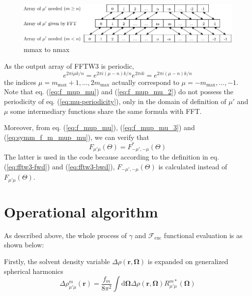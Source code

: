 \begin{figure}[h]
\centering{}%
\begin{minipage}[t]{1\textwidth}%
\begin{center}
\includegraphics[width=1\textwidth]{_figure/mmax_to_nmax}
\par\end{center}

\caption[mmax to nmax]{mmax to nmax\label{fig:FFTW3-2D-mmax_to_nmax}}
%
\end{minipage}
\end{figure}


As the output array of FFTW3 is periodic,
\begin{equation}
e^{2\pi i\mu k/n}=e^{2\pi i(\mu-n)k/n}e^{2\pi ik}=e^{2\pi i(\mu-n)k/n}\label{eq:mu-periodicity}
\end{equation}
the indices $\mu=m_{\mathrm{max}}+1,\ldots,2m_{\mathrm{max}}$ actually
correspond to $\mu=-m_{\mathrm{max}},\ldots,-1$. Note that eq. (\ref{eq:f_mup_mu})
and (\ref{eq:f_mup_mu_2}) do not possess the periodicity of eq. (\ref{eq:mu-periodicity}),
only in the domain of definition of $\mu'$ and $\mu$ some intermediary
functions share the same formula with FFT.

Moreover, from eq. (\ref{eq:f_mup_mu}), (\ref{eq:f_mup_mu_3}) and
(\ref{eq:symm_f_m_mup_mu}), we can verify that
\begin{equation}
F_{\mu'\mu}(\Theta)=F_{-\mu',-\mu}^{*}(\Theta)
\end{equation}
The latter is used in the code because according to the definition
in eq. (\ref{eq:fftw3-fwd}) and (\ref{eq:fftw3-bwd}), $F_{-\mu',-\mu}(\Theta)$
is calculated instead of $F_{\mu'\mu}(\Theta)$.


\section{Operational algorithm\label{sec:Operational-algorithm}}

As described above, the whole process of $\gamma$ and $\mathcal{F}_{\mathrm{exc}}$
functional evaluation is as shown below: 

Firstly, the solvent density variable $\Delta\rho(\mathbf{r},\mathbf{\Omega})$
is expanded on generalized spherical harmonics
\begin{equation}
\Delta\rho_{\mu'\mu}^{m}(\mathbf{r})=\frac{f_{m}}{8\pi^{2}}\int\mathrm{d}\mathbf{\Omega}\Delta\rho(\mathbf{r},\mathbf{\Omega})R_{\mu'\mu}^{m*}(\mathbf{\Omega})\label{eq:fgsht-fwd}
\end{equation}


